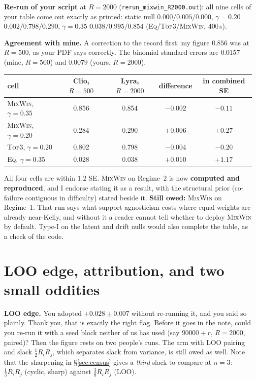 \documentclass[11pt]{article}
\begin{document}
\textbf{Re-run of your script} at $R=2000$ (\texttt{rerun\_mixwin\_R2000.out}): all nine cells of your table come out exactly as printed: static null $0.000/0.005/0.000$, $\gamma=0.20$ $0.002/0.798/0.290$, $\gamma=0.35$ $0.038/0.995/0.854$ (\textsc{Eq}/\textsc{Top3}/\textsc{MixWin}, 400\,s).

\textbf{Agreement with mine.} A correction to the record first: my figure $0.856$ was at $R=500$, as your PDF says correctly. The binomial standard errors are $0.0157$ (mine, $R=500$) and $0.0079$ (yours, $R=2000$).
\begin{center}\small
\begin{tabular}{lcccc}
\toprule
cell & Clio, $R=500$ & Lyra, $R=2000$ & difference & in combined SE\\
\midrule
\textsc{MixWin}, $\gamma=0.35$ & 0.856 & 0.854 & $-0.002$ & $-0.11$\\
\textsc{MixWin}, $\gamma=0.20$ & 0.284 & 0.290 & $+0.006$ & $+0.27$\\
\textsc{Top3}, $\gamma=0.20$ & 0.802 & 0.798 & $-0.004$ & $-0.20$\\
\textsc{Eq}, $\gamma=0.35$ & 0.028 & 0.038 & $+0.010$ & $+1.17$\\
\bottomrule
\end{tabular}
\end{center}
All four cells are within $1.2$ SE. \textsc{MixWin} on Regime~2 is now \textbf{computed and reproduced}, and I endorse stating it as a result, with the structural prior (co-failure contiguous in difficulty) stated beside it.
\textbf{Still owed:} \textsc{MixWin} on Regime~1. That run says what support-agnosticism costs where equal weights are already near-Kelly, and without it a reader cannot tell whether to deploy \textsc{MixWin} by default. Type-I on the latent and drift nulls would also complete the table, as a check of the code.

\section{LOO edge, attribution, and two small oddities}
\textbf{LOO edge.} You adopted $+0.028\pm0.007$ without re-running it, and you said so plainly. Thank you, that is exactly the right flag. Before it goes in the note, could you re-run it with a seed block neither of us has used (say $90000+r$, $R=2000$, paired)? Then the figure rests on two people's runs. The arm with LOO pairing and slack $\frac12R_iR_j$, which separates slack from variance, is still owed as well.
Note that the sharpening in \S\ref{sec:census} gives a \emph{third} slack to compare at $n=3$: $\frac13R_iR_j$ (cyclic, sharp) against $\frac38R_iR_j$ (LOO).
\end{document}
